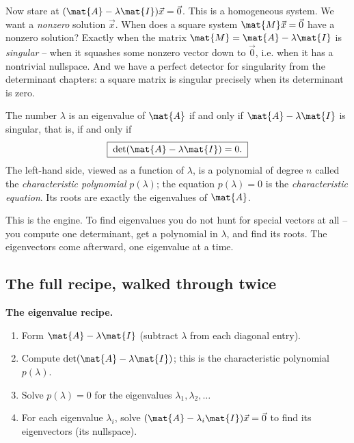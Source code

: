 Now stare at $(\mat{A}-\lambda\mat{I})\vec{x}=\vec{0}$. This is a homogeneous
system. We want a \emph{nonzero} solution $\vec{x}$. When does a square system
$\mat{M}\vec{x}=\vec{0}$ have a nonzero solution? Exactly when the matrix
$\mat{M}=\mat{A}-\lambda\mat{I}$ is \emph{singular} -- when it squashes some
nonzero vector down to $\vec{0}$, i.e. when it has a nontrivial nullspace. And we
have a perfect detector for singularity from the determinant chapters: a square
matrix is singular precisely when its determinant is zero.

\begin{formalbox}
The number $\lambda$ is an eigenvalue of $\mat{A}$ if and only if
$\mat{A}-\lambda\mat{I}$ is singular, that is, if and only if
\[
  \boxed{\;\det(\mat{A}-\lambda\mat{I})=0.\;}
\]
The left-hand side, viewed as a function of $\lambda$, is a polynomial of degree
$n$ called the \emph{characteristic polynomial} $p(\lambda)$; the equation
$p(\lambda)=0$ is the \emph{characteristic equation}. Its roots are exactly the
eigenvalues of $\mat{A}$.
\end{formalbox}

This is the engine. To find eigenvalues you do not hunt for special vectors at
all -- you compute one determinant, get a polynomial in $\lambda$, and find its
roots. The eigenvectors come afterward, one eigenvalue at a time.

\subsection{The full recipe, walked through twice}
\label{ch23:recipe}

\begin{focusbox}
\textbf{The eigenvalue recipe.}
\begin{enumerate}
  \item Form $\mat{A}-\lambda\mat{I}$ (subtract $\lambda$ from each diagonal entry).
  \item Compute $\det(\mat{A}-\lambda\mat{I})$; this is the characteristic
        polynomial $p(\lambda)$.
  \item Solve $p(\lambda)=0$ for the eigenvalues $\lambda_1,\lambda_2,\dots$
  \item For each eigenvalue $\lambda_i$, solve $(\mat{A}-\lambda_i\mat{I})\vec{x}=\vec{0}$
        to find its eigenvectors (its nullspace).
\end{enumerate}
\end{focusbox}

